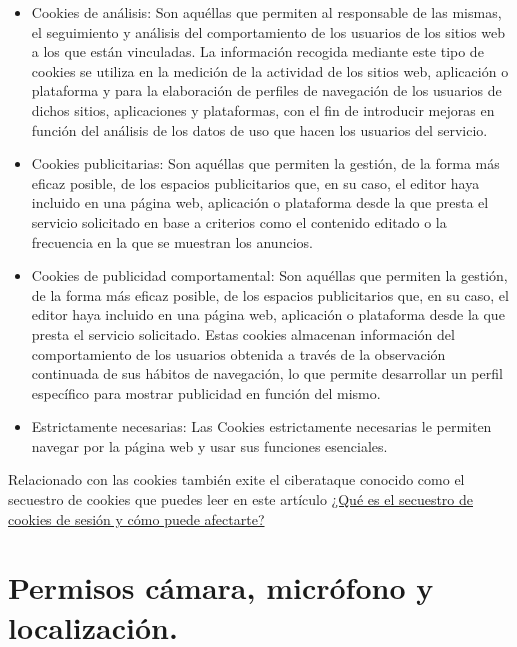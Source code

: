 \documentclass[
  a4paper,
  openany]{book}
\begin{document}
\begin{itemize}
\item
  Cookies de análisis: Son aquéllas que permiten al responsable de las mismas, el seguimiento y análisis del comportamiento de los usuarios de los sitios web a los que están vinculadas. La información recogida mediante este tipo de cookies se utiliza en la medición de la actividad de los sitios web, aplicación o plataforma y para la elaboración de perfiles de navegación de los usuarios de dichos sitios, aplicaciones y plataformas, con el fin de introducir mejoras en función del análisis de los datos de uso que hacen los usuarios del servicio.
\item
  Cookies publicitarias: Son aquéllas que permiten la gestión, de la forma más eficaz posible, de los espacios publicitarios que, en su caso, el editor haya incluido en una página web, aplicación o plataforma desde la que presta el servicio solicitado en base a criterios como el contenido editado o la frecuencia en la que se muestran los anuncios.
\item
  Cookies de publicidad comportamental: Son aquéllas que permiten la gestión, de la forma más eficaz posible, de los espacios publicitarios que, en su caso, el editor haya incluido en una página web, aplicación o plataforma desde la que presta el servicio solicitado. Estas cookies almacenan información del comportamiento de los usuarios obtenida a través de la observación continuada de sus hábitos de navegación, lo que permite desarrollar un perfil específico para mostrar publicidad en función del mismo.
\item
  Estrictamente necesarias: Las Cookies estrictamente necesarias le permiten navegar por la página web y usar sus funciones esenciales.
\end{itemize}

Relacionado con las cookies también exite el ciberataque conocido como el secuestro de cookies que puedes leer en este artículo \href{https://www.incibe.es/ciudadania/blog/que-es-el-secuestro-de-cookies-de-sesion-y-como-puede-afectarte}{¿Qué es el secuestro de cookies de sesión y cómo puede afectarte?}

\hypertarget{permisos-cuxe1mara-micruxf3fono-y-localizaciuxf3n.}{%
\section{Permisos cámara, micrófono y localización.}\label{permisos-cuxe1mara-micruxf3fono-y-localizaciuxf3n.}}
\end{document}

